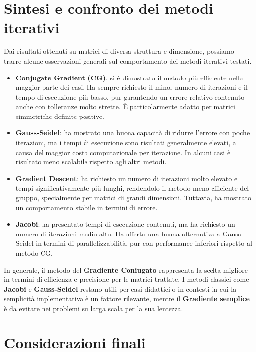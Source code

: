 \section{Sintesi e confronto dei metodi iterativi}

Dai risultati ottenuti su matrici di diversa struttura e dimensione, possiamo trarre alcune osservazioni generali sul comportamento dei metodi iterativi testati.

\begin{itemize}
    \item \textbf{Conjugate Gradient (CG)}: si è dimostrato il metodo più efficiente nella maggior parte dei casi. Ha sempre richiesto il minor numero di iterazioni e il tempo di esecuzione più basso, pur garantendo un errore relativo contenuto anche con tolleranze molto strette. È particolarmente adatto per matrici simmetriche definite positive.

    \item \textbf{Gauss-Seidel}: ha mostrato una buona capacità di ridurre l'errore con poche iterazioni, ma i tempi di esecuzione sono risultati generalmente elevati, a causa del maggior costo computazionale per iterazione. In alcuni casi è risultato meno scalabile rispetto agli altri metodi.

    \item \textbf{Gradient Descent}: ha richiesto un numero di iterazioni molto elevato e tempi significativamente più lunghi, rendendolo il metodo meno efficiente del gruppo, specialmente per matrici di grandi dimensioni. Tuttavia, ha mostrato un comportamento stabile in termini di errore.

    \item \textbf{Jacobi}: ha presentato tempi di esecuzione contenuti, ma ha richiesto un numero di iterazioni medio-alto. Ha offerto una buona alternativa a Gauss-Seidel in termini di parallelizzabilità, pur con performance inferiori rispetto al metodo CG.
\end{itemize}

In generale, il metodo del \textbf{Gradiente Coniugato} rappresenta la scelta migliore in termini di efficienza e precisione per le matrici trattate. I metodi classici come \textbf{Jacobi} e \textbf{Gauss-Seidel} restano utili per casi didattici o in contesti in cui la semplicità implementativa è un fattore rilevante, mentre il \textbf{Gradiente semplice} è da evitare nei problemi su larga scala per la sua lentezza.


\section{Considerazioni finali}

